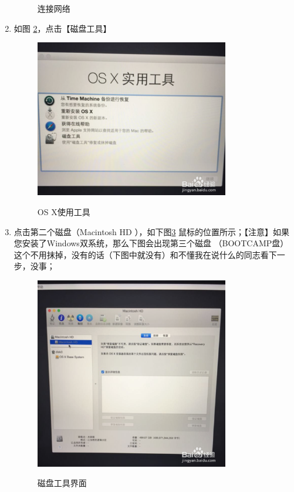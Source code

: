 \documentclass{article}
\begin{document}
\begin{enumerate}
\begin{figure}[!htb]
  \label{wifi}
  \caption{连接网络}
  \end{figure}
\item 如图 \ref{cipangongju}，点击【磁盘工具】
 \begin{figure}[!htb] %
 \centering
 \includegraphics[width=0.8\textwidth]{figures/cipangongju.png}
 \label{cipangongju}
 \caption{OS X使用工具}
 \end{figure}
\item 点击第二个磁盘（Macintosh HD ），如下图\ref{hd} 鼠标的位置所示；【注意】如果您安装了Windows双系统，那么下图会出现第三个磁盘  （BOOTCAMP盘）这个不用抹掉，没有的话（下图中就没有）和不懂我在说什么的同志看下一步，没事；
 \begin{figure}[!htb] %
 \centering
 \includegraphics[width=0.8\textwidth]{figures/hd.png}
 \label{hd}
 \caption{磁盘工具界面}
 \end{figure}


\end{enumerate}
\end{document}
